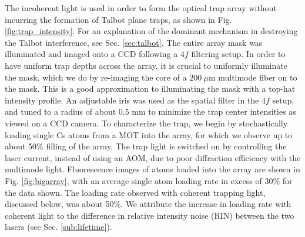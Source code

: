 The incoherent light is used in order to form the optical trap array without incurring the formation of Talbot plane traps, as shown in Fig. \ref{fig:trap_intensity}. For an explanation of the dominant mechanism in destroying the Talbot interference, see Sec. \ref{sec:talbot}. The entire array mask was illuminated and imaged onto a CCD following a $4f$ filtering setup. In order to have uniform trap depths across the array, it is crucial to uniformly illuminate the mask, which we do by re-imaging the core of a $200~\mu$m multimode fiber on to the mask. This is a good approximation to illuminating the mask with a top-hat intensity profile. An adjustable iris was used as the spatial filter in the $4f$ setup, and tuned to a radius of about 0.5 mm to minimize the trap center intensities as viewed on a CCD camera. To characterize the trap, we begin by stochastically loading single Cs atoms from a MOT into the array, for which we observe up to about 50$\%$ filling of the array. The trap light is switched on by controlling the laser current, instead of using an AOM, due to poor diffraction efficiency with the multimode light. Fluorescence images of atoms loaded into the array are shown in Fig. \ref{fig:bigarray}, with an average single atom loading rate in excess of 30$\%$ for the data shown. The loading rate  observed with coherent trapping light, discussed below, was about 50$\%$. We attribute the increase in loading rate with coherent light to the difference in relative intensity noise (RIN) between the two lasers (see Sec. \ref{sub:lifetime}). 

